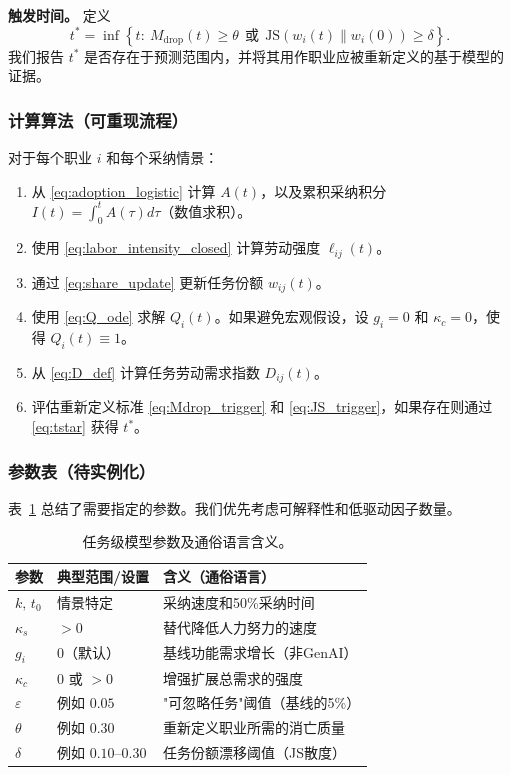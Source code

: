\noindent\textbf{触发时间。} 定义
\begin{equation}
\label{eq:tstar}
t^*=\inf\left\{t:\ M_{\text{drop}}(t)\ge\theta\ \ \text{或}\ \ \mathrm{JS}(w_i(t)\|w_i(0))\ge\delta\right\}.
\end{equation}
我们报告 $t^*$ 是否存在于预测范围内，并将其用作职业应被重新定义的基于模型的证据。

\subsubsection{计算算法（可重现流程）}
\label{sec:algorithm}
对于每个职业 $i$ 和每个采纳情景：
\begin{enumerate}
  \item 从 \eqref{eq:adoption_logistic} 计算 $A(t)$，以及累积采纳积分 $I(t)=\int_0^t A(\tau)d\tau$（数值求积）。
  \item 使用 \eqref{eq:labor_intensity_closed} 计算劳动强度 $\ell_{ij}(t)$。
  \item 通过 \eqref{eq:share_update} 更新任务份额 $w_{ij}(t)$。
  \item 使用 \eqref{eq:Q_ode} 求解 $Q_i(t)$。如果避免宏观假设，设 $g_i=0$ 和 $\kappa_c=0$，使得 $Q_i(t)\equiv 1$。
  \item 从 \eqref{eq:D_def} 计算任务劳动需求指数 $D_{ij}(t)$。
  \item 评估重新定义标准 \eqref{eq:Mdrop_trigger} 和 \eqref{eq:JS_trigger}，如果存在则通过 \eqref{eq:tstar} 获得 $t^*$。
\end{enumerate}

\subsubsection{参数表（待实例化）}
\label{sec:param_table}
表~\ref{tab:params_task_model} 总结了需要指定的参数。我们优先考虑可解释性和低驱动因子数量。

\begin{table}[ht]
\centering
\caption{任务级模型参数及通俗语言含义。}
\label{tab:params_task_model}
\begin{tabular}{lll}
\hline
参数 & 典型范围/设置 & 含义（通俗语言） \\
\hline
$k,\,t_0$ & 情景特定 & 采纳速度和50\%采纳时间 \\
$\kappa_s$ & $>0$ & 替代降低人力努力的速度 \\
$g_i$ & $0$（默认） & 基线功能需求增长（非GenAI） \\
$\kappa_c$ & $0$ 或 $>0$ & 增强扩展总需求的强度 \\
$\varepsilon$ & 例如 $0.05$ & "可忽略任务"阈值（基线的5\%） \\
$\theta$ & 例如 $0.30$ & 重新定义职业所需的消亡质量 \\
$\delta$ & 例如 $0.10$--$0.30$ & 任务份额漂移阈值（JS散度） \\
\hline
\end{tabular}
\end{table}

